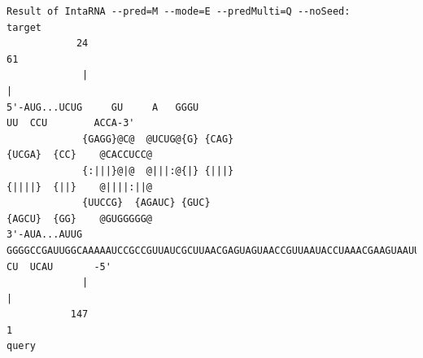 \documentclass[11pt,a4paper]{report}
\begin{document}
\begin{landscape}
\begin{lstlisting}[style=special]
Result of IntaRNA --pred=M --mode=E --predMulti=Q --noSeed:
target
            24                                                                                                                                                    61
             |                                                                                                                                                    |
5'-AUG...UCUG     GU     A   GGGU                                                                                                                   UU  CCU        ACCA-3'
             {GAGG}@C@  @UCUG@{G} {CAG}                                                                                                                   {UCGA}  {CC}    @CACCUCC@
             {:|||}@|@  @|||:@{|} {|||}                                                                                                                   {||||}  {||}    @||||:||@
             {UUCCG}  {AGAUC} {GUC}                                                                                                                   {AGCU}  {GG}    @GUGGGGG@
3'-AUA...AUUG                GGGGCCGAUUGGCAAAAAUCCGCCGUUAUCGCUUAACGAGUAGUAACCGUUAAUACCUAAACGAAGUAAUUGCAGCUAGCGGACUGCUCAACGGACGCGUGGAAACAGGCGGGAC    CU  UCAU       -5'
             |                                                                                                                                                    |
           147                                                                                                                                                    1
query



\end{lstlisting}
\end{landscape}
\end{document}
